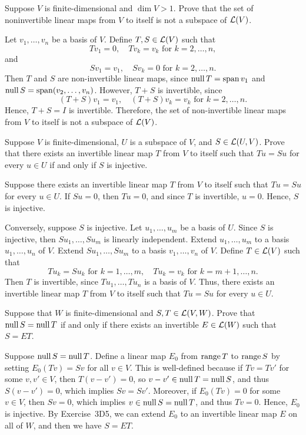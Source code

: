 \begin{exc}
\begin{exercise}
Suppose $V$ is finite-dimensional and $\dim V>1$. Prove that the set of
noninvertible linear maps from $V$ to itself is not a subspace of $\mathcal{L}(V)$.
\end{exercise}
\begin{solution}
Let $v_1,\dots,v_n$ be a basis of $V$. Define $T,S\in\mathcal{L}(V)$ such that
\[ Tv_1 = 0, \quad Tv_k = v_k \text{ for } k=2,\dots,n, \]
and
\[ Sv_1 = v_1, \quad Sv_k = 0 \text{ for } k=2,\dots,n. \]
Then $T$ and $S$ are non-invertible linear maps, since $\operatorname{null} T=\operatorname{span} v_1$ and
$\operatorname{null} S=\operatorname{span}(v_2,\dots,v_n)$. However, $T+S$ is invertible, since
\[ (T+S)v_1 = v_1, \quad (T+S)v_k = v_k \text{ for } k=2,\dots,n. \]
Hence, $T+S=I$ is invertible. Therefore, the set of non-invertible linear maps
from $V$ to itself is not a subspace of $\mathcal{L}(V)$.
\end{solution}

\begin{exercise}
Suppose $V$ is finite-dimensional, $U$ is a subspace of $V$, and
$S\in\mathcal{L}(U,V)$. Prove that there exists an invertible linear map $T$ from $V$
to itself such that $Tu=Su$ for every $u\in U$ if and only if $S$ is injective.
\end{exercise}
\begin{solution}
Suppose there exists an invertible linear map $T$ from $V$ to itself such that
$Tu=Su$ for every $u\in U$. If $Su=0$, then $Tu=0$, and since $T$ is
invertible, $u=0$. Hence, $S$ is injective.

Conversely, suppose $S$ is injective. Let $u_1,\dots,u_m$ be a basis of $U$.
Since $S$ is injective, then $Su_1,\dots,Su_m$ is linearly independent. Extend
$u_1,\dots,u_m$ to a basis $u_1,\dots,u_n$ of $V$. Extend $Su_1,\dots,Su_m$ to
a basis $v_1,\dots,v_n$ of $V$. Define $T\in\mathcal{L}(V)$ such that
\[ Tu_k = Su_k \text{ for } k=1,\dots,m, \quad
   Tu_k = v_k \text{ for } k=m+1,\dots,n. \]
Then $T$ is invertible, since $Tu_1,\dots,Tu_n$ is a basis of $V$. Thus, there
exists an invertible linear map $T$ from $V$ to itself such that $Tu=Su$ for
every $u\in U$.
\end{solution}

\begin{exercise}
Suppose that $W$ is finite-dimensional and $S,T\in\mathcal{L}(V,W)$. Prove that
$\operatorname{null} S=\operatorname{null} T$ if and only if there exists an invertible $E\in\mathcal{L}(W)$ such
that $S=ET$.
\end{exercise}
\begin{solution}
Suppose $\operatorname{null} S=\operatorname{null} T$. Define a linear map $E_0$ from $\operatorname{range} T$ to
$\operatorname{range} S$ by setting $E_0(Tv)=Sv$ for all $v\in V$. This is well-defined
because if $Tv=Tv'$ for some $v,v'\in V$, then $T(v-v')=0$, so
$v-v'\in\operatorname{null} T=\operatorname{null} S$, and thus $S(v-v')=0$, which implies $Sv=Sv'$. Moreover,
if $E_0(Tv)=0$ for some $v\in V$, then $Sv=0$, which implies
$v\in\operatorname{null} S=\operatorname{null} T$, and thus $Tv=0$. Hence, $E_0$ is injective. By
Exercise~3D5, we can extend $E_0$ to an invertible linear map $E$ on all of
$W$, and then we have $S=ET$.


\end{solution}
\end{exc}
